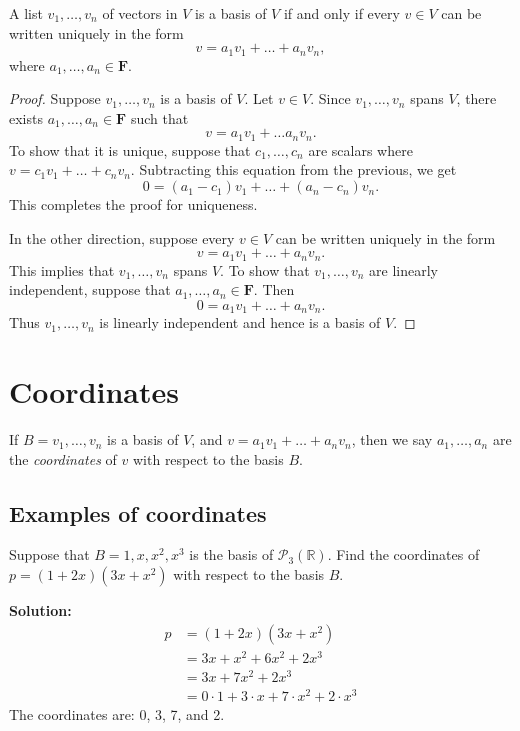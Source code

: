 \documentclass[11pt]{article}
\begin{document}
    A list \(v_1, \dots, v_n\) of vectors in $V$ is a basis of $V$ if and only if every \(v \in V\) can be written uniquely in the form \[v = a_1 v_1 + \dots + a_n v_n,\] where \(a_1, \dots, a_n \in \textbf{F}.\)

    \begin{proof}
        Suppose \(v_1, \dots, v_n\) is a basis of $V$. Let \(v \in V\). Since \(v_1, \dots, v_n\) spans $V$, there exists \(a_1, \dots, a_n \in \textbf{F}\) such that \[v = a_1 v_1 + \dots  a_n v_n.\] To show that it is unique, suppose that \(c_1, \dots, c_n\) are scalars where \(v = c_1 v_1 + \dots + c_n v_n\). Subtracting this equation from the previous, we get \[0 = (a_1 - c_1) v_1 + \dots + (a_n - c_n)v_n.\] This completes the proof for uniqueness.

        In the other direction, suppose every \(v \in V\) can be written uniquely in the form \[v = a_1 v_1 + \dots + a_n v_n.\] This implies that \(v_1, \dots, v_n\) spans $V$. To show that \(v_1, \dots, v_n\) are linearly independent, suppose that \(a_1, \dots, a_n \in \textbf{F}\). Then \[0 = a_1 v_1 + \dots + a_n v_n.\] Thus \(v_1, \dots, v_n\) is linearly independent and hence is a basis of $V$.
    \end{proof}

    \section{Coordinates}

    If \(B = v_1, \dots, v_n\) is a basis of $V$, and \(v = a_1 v_1 + \dots + a_n v_n\), then we say \(a_1, \dots, a_n\) are the \emph{coordinates} of $v$ with respect to the basis $B$.

    \subsection{Examples of coordinates}

    Suppose that \(B = 1,x,x^2, x^3\) is the basis of \(\mathcal{P}_3 (\mathbb{R})\). Find the coordinates of \(p = (1+2x)(3x + x^2)\) with respect to the basis $B$.

    \vspace{1em}

    \textbf{Solution:}
    \begin{align*}
        p &= (1 + 2x)(3x + x^2) \\
          &= 3x + x^2 + 6x^2 + 2x^3 \\
          &= 3x + 7x^2 + 2x^3 \\
          &= 0 \cdot 1 + 3 \cdot x + 7 \cdot x^2 + 2 \cdot x^3
    \end{align*}
    The coordinates are: 0, 3, 7, and 2.
\end{document}
